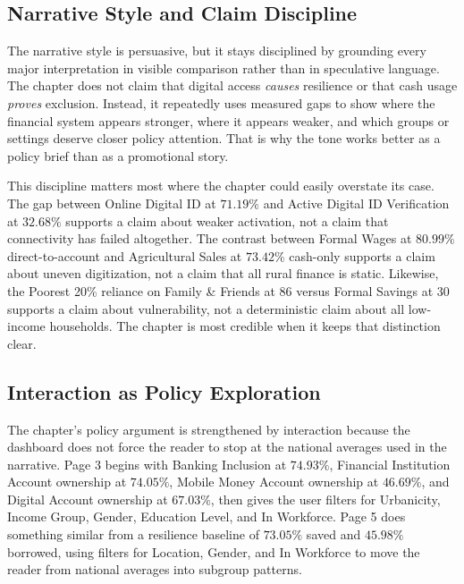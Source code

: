 \documentclass[../main.tex]{subfiles}
\begin{document}
\subsection{Narrative Style and Claim Discipline}
\label{subsec:narrative-style}

The narrative style is persuasive, but it stays disciplined by grounding every
major interpretation in visible comparison rather than in speculative language.
The chapter does not claim that digital access \emph{causes} resilience or that
cash usage \emph{proves} exclusion. Instead, it repeatedly uses measured gaps to
show where the financial system appears stronger, where it appears weaker, and
which groups or settings deserve closer policy attention. That is why the tone
works better as a policy brief than as a promotional story.

This discipline matters most where the chapter could easily overstate its case.
The gap between Online Digital ID at \(71.19\%\) and Active Digital ID
Verification at \(32.68\%\) supports a claim about weaker activation, not a
claim that connectivity has failed altogether. The contrast between Formal
Wages at \(80.99\%\) direct-to-account and Agricultural Sales at \(73.42\%\)
cash-only supports a claim about uneven digitization, not a claim that all
rural finance is static. Likewise, the Poorest 20\% reliance on Family \&
Friends at 86 versus Formal Savings at 30 supports a claim about vulnerability,
not a deterministic claim about all low-income households. The chapter is most
credible when it keeps that distinction clear.


\subsection{Interaction as Policy Exploration}
\label{subsec:interaction-exploration-story}

The chapter's policy argument is strengthened by interaction because the
dashboard does not force the reader to stop at the national averages used in
the narrative. Page 3 begins with Banking Inclusion at \(74.93\%\), Financial
Institution Account ownership at \(74.05\%\), Mobile Money Account ownership at
\(46.69\%\), and Digital Account ownership at \(67.03\%\), then gives the user
filters for Urbanicity, Income Group, Gender, Education Level, and In
Workforce. Page 5 does something similar from a resilience baseline of
\(73.05\%\) saved and \(45.98\%\) borrowed, using filters for Location, Gender,
and In Workforce to move the reader from national averages into subgroup
patterns.
\end{document}
